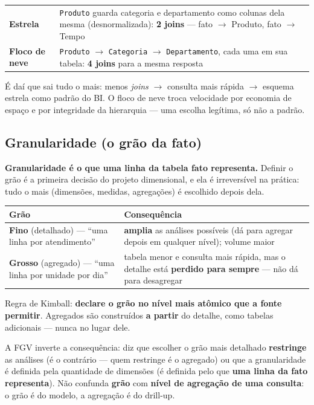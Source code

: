 \begin{center}
\begin{tabular}{@{}p{2.5cm}p{9.2cm}@{}}
\toprule
\textbf{Estrela} & \texttt{Produto} guarda categoria e departamento como
colunas dela mesma (desnormalizada): \textbf{2 joins} --- fato $\to$ Produto,
fato $\to$ Tempo \\
\textbf{Floco de neve} & \texttt{Produto} $\to$ \texttt{Categoria} $\to$
\texttt{Departamento}, cada uma em sua tabela: \textbf{4 joins} para a mesma
resposta \\
\bottomrule
\end{tabular}
\end{center}

É daí que sai tudo o mais: menos \emph{joins} $\to$ consulta mais rápida $\to$
esquema estrela como padrão do BI. O floco de neve troca velocidade por
economia de espaço e por integridade da hierarquia --- uma escolha legítima,
só não a padrão.

\subsection{Granularidade (o grão da fato)}

\textbf{Granularidade é o que uma linha da tabela fato representa.} Definir o
grão é a primeira decisão do projeto dimensional, e ela é irreversível na
prática: tudo o mais (dimensões, medidas, agregações) é escolhido depois
dela.

\begin{center}
\begin{tabular}{@{}p{3.4cm}p{7.6cm}@{}}
\toprule
\textbf{Grão} & \textbf{Consequência} \\
\midrule
\textbf{Fino} (detalhado) --- ``uma linha por atendimento'' & \textbf{amplia} as análises possíveis (dá para agregar depois em qualquer nível); volume maior \\
\textbf{Grosso} (agregado) --- ``uma linha por unidade por dia'' & tabela menor e consulta mais rápida, mas o detalhe está \textbf{perdido para sempre} --- não dá para desagregar \\
\bottomrule
\end{tabular}
\end{center}

Regra de Kimball: \textbf{declare o grão no nível mais atômico que a fonte
permitir}. Agregados são construídos \textbf{a partir} do detalhe, como
tabelas adicionais --- nunca no lugar dele.

\begin{pegadinha}
A FGV inverte a consequência: diz que escolher o grão mais detalhado
\textbf{restringe} as análises (é o contrário --- quem restringe é o
agregado) ou que a granularidade é definida pela quantidade de dimensões (é
definida pelo que \textbf{uma linha da fato representa}). Não confunda
\textbf{grão} com \textbf{nível de agregação de uma consulta}: o grão é do
modelo, a agregação é do drill-up.
\end{pegadinha}

